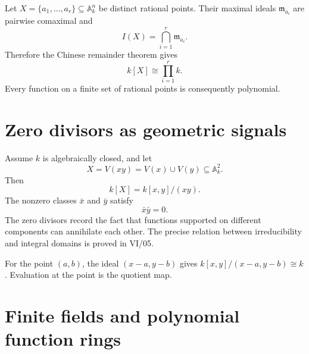 Let \(X=\{a_1,\dots,a_r\}\subseteq\mathbb A_k^n\) be distinct rational points.  Their
maximal ideals \(\mathfrak m_{a_i}\) are pairwise comaximal and
\[
I(X)=\bigcap_{i=1}^r\mathfrak m_{a_i}.
\]
Therefore the Chinese remainder theorem gives
\[
k[X]\cong\prod_{i=1}^r k.
\]
Every function on a finite set of rational points is consequently polynomial.

\begin{center}
\end{center}

\section{Zero divisors as geometric signals}
\label{sec:vi03-zero-divisors}

Assume \(k\) is algebraically closed, and let
\[
X=V(xy)=V(x)\cup V(y)\subseteq\mathbb A_k^2.
\]
Then
\[
k[X]=k[x,y]/(xy).
\]
The nonzero classes \(\bar x\) and \(\bar y\) satisfy
\[
\bar x\bar y=0.
\]
The zero divisors record the fact that functions supported on different components can
annihilate each other.  The precise relation between irreducibility and integral domains is
proved in VI/05.

\begin{example}[A point]\label{ex:vi03-expand-03}
For the point $(a,b)$, the ideal $(x-a,y-b)$ gives $k[x,y]/(x-a,y-b)\cong k$.  Evaluation at the point is the quotient map.
\end{example}
\section{Finite fields and polynomial function rings}
\label{sec:vi03-finite-fields}

